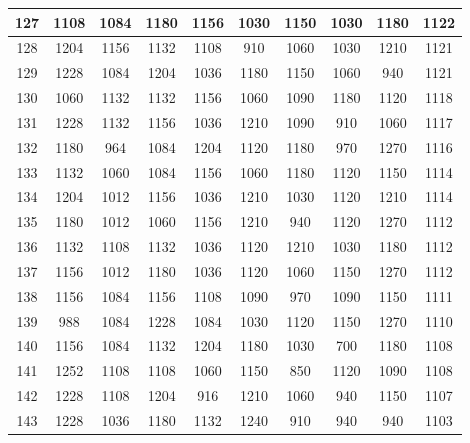 \documentclass{article}
\begin{document}
\begin{table}
\begin{tabular}{c|c|c|c|c|c|c|c|c|c|}
\multicolumn{1}{|c|}{127} & 1108 & 1084 & 1180 & 1156 & 1030 & 1150 & 1030 & 1180 & 1122 \\ \hline
\multicolumn{1}{|c|}{128} & 1204 & 1156 & 1132 & 1108 & 910  & 1060 & 1030 & 1210 & 1121 \\ \hline
\multicolumn{1}{|c|}{129} & 1228 & 1084 & 1204 & 1036 & 1180 & 1150 & 1060 & 940  & 1121 \\ \hline
\multicolumn{1}{|c|}{130} & 1060 & 1132 & 1132 & 1156 & 1060 & 1090 & 1180 & 1120 & 1118 \\ \hline
\multicolumn{1}{|c|}{131} & 1228 & 1132 & 1156 & 1036 & 1210 & 1090 & 910  & 1060 & 1117 \\ \hline
\multicolumn{1}{|c|}{132} & 1180 & 964  & 1084 & 1204 & 1120 & 1180 & 970  & 1270 & 1116 \\ \hline
\multicolumn{1}{|c|}{133} & 1132 & 1060 & 1084 & 1156 & 1060 & 1180 & 1120 & 1150 & 1114 \\ \hline
\multicolumn{1}{|c|}{134} & 1204 & 1012 & 1156 & 1036 & 1210 & 1030 & 1120 & 1210 & 1114 \\ \hline
\multicolumn{1}{|c|}{135} & 1180 & 1012 & 1060 & 1156 & 1210 & 940  & 1120 & 1270 & 1112 \\ \hline
\multicolumn{1}{|c|}{136} & 1132 & 1108 & 1132 & 1036 & 1120 & 1210 & 1030 & 1180 & 1112 \\ \hline
\multicolumn{1}{|c|}{137} & 1156 & 1012 & 1180 & 1036 & 1120 & 1060 & 1150 & 1270 & 1112 \\ \hline
\multicolumn{1}{|c|}{138} & 1156 & 1084 & 1156 & 1108 & 1090 & 970  & 1090 & 1150 & 1111 \\ \hline
\multicolumn{1}{|c|}{139} & 988  & 1084 & 1228 & 1084 & 1030 & 1120 & 1150 & 1270 & 1110 \\ \hline
\multicolumn{1}{|c|}{140} & 1156 & 1084 & 1132 & 1204 & 1180 & 1030 & 700  & 1180 & 1108 \\ \hline
\multicolumn{1}{|c|}{141} & 1252 & 1108 & 1108 & 1060 & 1150 & 850  & 1120 & 1090 & 1108 \\ \hline
\multicolumn{1}{|c|}{142} & 1228 & 1108 & 1204 & 916  & 1210 & 1060 & 940  & 1150 & 1107 \\ \hline
\multicolumn{1}{|c|}{143} & 1228 & 1036 & 1180 & 1132 & 1240 & 910  & 940  & 940  & 1103 \\ \hline

\end{tabular}
\end{table}
\end{document}
